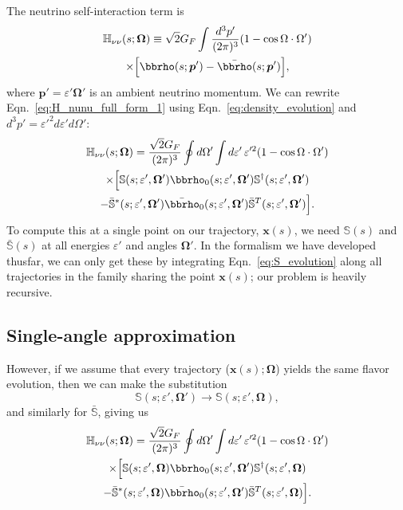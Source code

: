 \documentclass[aps,prd,twocolumn,superscriptaddress,groupedaddress]{revtex4}
\begin{document}
The neutrino self-interaction term is
\begin{multline}
  \label{eq:H_nunu_full_form_1}
  \mathbb{H}_{\nu\nu}(s;\bm{\Omega}) \equiv
  \sqrt{2} G_F
  \int \frac{d^3p'}{(2\pi)^3}
  (1-\cos\Omega\cdot\Omega') \\
  \times
  \Big[\bbrho(s;\bm{p}')-\bar{\bbrho}(s;\bm{p}')\Big],
\end{multline}
where $\bm{p}'=\varepsilon' \bm{\Omega}'$ is an ambient neutrino
momentum. We can rewrite Eqn.~\ref{eq:H_nunu_full_form_1} using
Eqn.~\ref{eq:density_evolution} and
$d^3p'=\varepsilon'^2 d\varepsilon' d\Omega'$:
\begin{multline}
  \label{eq:H_nunu_full_form_2}
  \mathbb{H}_{\nu\nu}(s;\bm{\Omega}) =
  \frac{\sqrt{2} G_F}{(2\pi)^3}
  \oint d\Omega' \int d\varepsilon' \,\varepsilon'^2
  (1-\cos\Omega\cdot\Omega') \\
  \times \Big[
    \mathbb{S}(s;\varepsilon',\bm{\Omega}')
    \bbrho_0(s;\varepsilon',\bm{\Omega}')
    \mathbb{S}^\dagger(s;\varepsilon',\bm{\Omega}') \\
    -\bar{\mathbb{S}}^*(s;\varepsilon',\bm{\Omega}')
    \bar{\bbrho}_0(s;\varepsilon',\bm{\Omega}')
    \bar{\mathbb{S}}^T(s;\varepsilon',\bm{\Omega}')
    \Big].
\end{multline}
To compute this at a single point on our trajectory, $\bm{x}(s)$,
we need $\mathbb{S}(s)$ and $\bar{\mathbb{S}}(s)$ at all
energies $\varepsilon'$ and angles $\bm{\Omega}'$. In the formalism
we have developed thusfar, we can only get these by integrating
Eqn.~\ref{eq:S_evolution} along all trajectories in the family
sharing the point $\bm{x}(s)$; our problem is heavily recursive.

\subsection*{Single-angle approximation}
However, if we assume that every trajectory ($\bm{x}(s);\bm{\Omega}$)
yields the same flavor evolution, then we can make the substitution
\begin{equation}
 \mathbb{S}(s;\varepsilon',\bm{\Omega}') \rightarrow
 \mathbb{S}(s;\varepsilon',\bm{\Omega}), \nonumber
\end{equation}
and similarly for $\bar{\mathbb{S}}$, giving us
\begin{multline}
  \label{eq:H_nunu_single_angle}
  \mathbb{H}_{\nu\nu}(s;\bm{\Omega}) =
  \frac{\sqrt{2} G_F}{(2\pi)^3}
  \oint d\Omega' \int d\varepsilon' \,\varepsilon'^2
  (1-\cos\Omega\cdot\Omega') \\
  \times \Big[
    \mathbb{S}(s;\varepsilon',\bm{\Omega})
    \bbrho_0(s;\varepsilon',\bm{\Omega}')
    \mathbb{S}^\dagger(s;\varepsilon',\bm{\Omega}) \\
    -\bar{\mathbb{S}}^*(s;\varepsilon',\bm{\Omega})
    \bar{\bbrho}_0(s;\varepsilon',\bm{\Omega}')
    \bar{\mathbb{S}}^T(s;\varepsilon',\bm{\Omega})
    \Big].
\end{multline}
\end{document}
